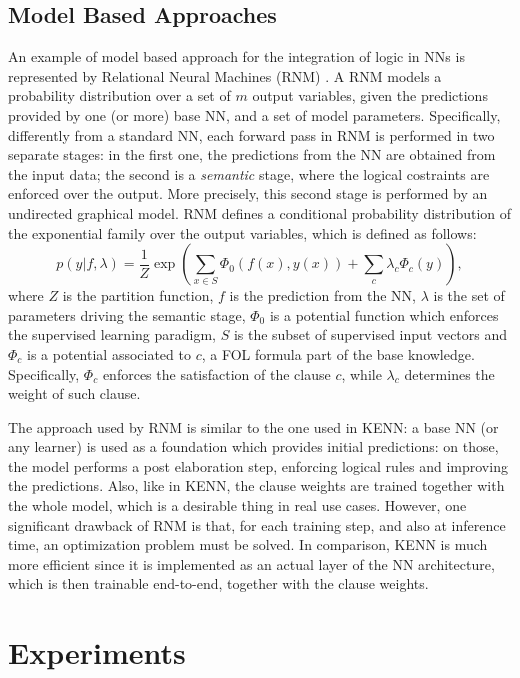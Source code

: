  \subsection{Model Based Approaches}
 An example of model based approach for the integration of logic in NNs is represented by Relational Neural Machines (RNM) \cite{marra2020relational}. A RNM models a probability distribution over a set of $m$ output variables, given the predictions provided by one (or more) base NN, and a set of model parameters. Specifically, differently from a standard NN, each forward pass in RNM is performed in two separate stages: in the first one, the predictions from the NN are obtained from the input data; the second is a \textit{semantic} stage, where the logical costraints are enforced over the output. More precisely, this second stage is performed by an undirected graphical model.
 RNM defines a conditional probability distribution of the exponential family over the output variables, which is defined as follows:
 \begin{equation*}
 p(y|f,\lambda) = \frac{1}{Z} \exp \left( \sum_{x \in S}\Phi_0(f(x),y(x))+\sum_c \lambda_c \Phi_c(y) \right), 
 \end{equation*}
 where $Z$ is the partition function, $f$ is the prediction from the NN, $\lambda$ is the set of parameters driving the semantic stage, $\Phi_0$ is a potential function which enforces the supervised learning paradigm, $S$ is the subset of supervised input vectors and $\Phi_c$ is a potential associated to $c$, a FOL formula part of the base knowledge. Specifically, $\Phi_c$ enforces the satisfaction of the clause $c$, while $\lambda_c$ determines the weight of such clause. 
 
 The approach used by RNM is similar to the one used in KENN: a base NN (or any learner) is used as a foundation which provides initial predictions: on those, the model performs a post elaboration step, enforcing logical rules and improving the predictions. Also, like in KENN, the clause weights are trained together with the whole model, which is a desirable thing in real use cases. However, one significant drawback of RNM is that, for each training step, and also at inference time, an optimization problem must be solved. In comparison, KENN is much more efficient since it is implemented as an actual layer of the NN architecture, which is then trainable end-to-end, together with the clause weights.
 
 
 
 \section{Experiments}
 
